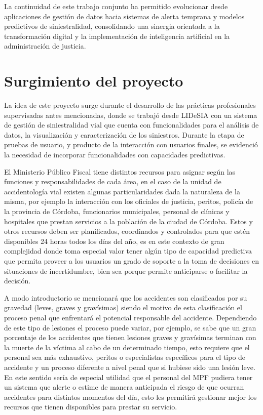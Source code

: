 La continuidad de este trabajo conjunto ha permitido evolucionar desde aplicaciones de gestión de datos hacia sistemas de alerta temprana y modelos predictivos de siniestralidad, consolidando una sinergia orientada a la transformación digital y la implementación de inteligencia artificial en la administración de justicia.

\section{Surgimiento del proyecto}\label{surgimiento-del-proyecto}

La idea de este proyecto surge durante el desarrollo de las prácticas profesionales supervisadas antes mencionadas, donde se trabajó desde LIDeSIA con un sistema de gestión de siniestralidad vial que cuenta con funcionalidades para el análisis de datos, la visualización y caracterización de los siniestros. Durante la etapa de pruebas de usuario, y producto de la interacción con usuarios finales, se evidenció la necesidad de incorporar funcionalidades con capacidades predictivas.

El Ministerio Público Fiscal tiene distintos recursos para asignar según las funciones y responsabilidades de cada área, en el caso de la unidad de accidentología vial existen algunas particularidades dada la naturaleza de la misma, por ejemplo la interacción con los oficiales de justicia, peritos, policía de la provincia de Córdoba, funcionarios municipales, personal de clínicas y hospitales que prestan servicios a la población de la ciudad de Córdoba. Estos y otros recursos deben ser planificados, coordinados y controlados para que estén disponibles 24 horas todos los días del año, es en este contexto de gran complejidad donde toma especial valor tener algún tipo de capacidad predictiva que permita proveer a los usuarios un grado de soporte a la toma de decisiones en situaciones de incertidumbre, bien sea porque permite anticiparse o facilitar la decisión.

A modo introductorio se mencionará que los accidentes son clasificados por su gravedad (leves, graves y gravísimas) siendo el motivo de esta clasificación el proceso penal que enfrentará el potencial responsable del accidente. Dependiendo de este tipo de lesiones el proceso puede variar, por ejemplo, se sabe que un gran porcentaje de los accidentes que tienen lesiones graves y gravísimas terminan con la muerte de la víctima al cabo de un determinado tiempo, esto requiere que el personal sea más exhaustivo, peritos o especialistas específicos para el tipo de accidente y un proceso diferente a nivel penal que si hubiese sido una lesión leve. En este sentido sería de especial utilidad que el personal del MPF pudiera tener un sistema que alerte o estime de manera anticipada el riesgo de que ocurran accidentes para distintos momentos del día, esto les permitirá gestionar mejor los recursos que tienen disponibles para prestar su servicio.

